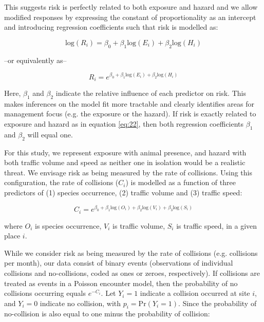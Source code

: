 This suggests risk is perfectly related to both exposure and hazard and we allow modified responses by expressing the constant of proportionality as an intercept and introducing regression coefficients such that risk is modelled as: 

\begin{equation} \label{eq:23}
\text{log}(R_i)=\beta_0+\beta_1\text{log}(E_i)+\beta_2\text{log}(H_i)
\end{equation}

\begin{center}
--or equivalently as--
\end{center}
\begin{equation} \label{eq:24}
R_i=e^{\beta_0+\beta_1\text{log}(E_i)+\beta_2\text{log}(H_i)}
\end{equation}

Here, $\beta_1$ and $\beta_2$ indicate the relative influence of each predictor on risk. This makes inferences on the model fit more tractable and clearly identifies areas for management focus (e.g. the exposure or the hazard). If risk is exactly related to exposure and hazard as in equation \ref{eq:22}, then both regression coefficients $\beta_1$ and $\beta_2$ will equal one.

For this study, we represent exposure with animal presence, and hazard with both traffic volume and speed as neither one in isolation would be a realistic threat. We envisage risk as being measured by the rate of collisions. Using this configuration, the rate of collisions ($C_i$) is modelled as a function of three predictors of (1) species occurrence, (2) traffic volume and (3) traffic speed: 
 
\begin{equation} \label{eq:25}
C_i=e^{\beta_0+\beta_1\text{log}(O_i)+\beta_2\text{log}(V_i)+\beta_3\text{log}(S_i)}
\end{equation}

where $O_i$ is species occurrence, $V_i$ is traffic volume, $S_i$ is traffic speed, in a given place $i$.

While we consider risk as being measured by the rate of collisions (e.g. collisions per month), our data consist of binary events (observations of individual collisions and no-collisions, coded as ones or zeroes, respectively). If collisions are treated as events in a Poisson encounter model, then the probability of no collisions occurring equals $e^{-C_i}$. Let $Y_i=1$ indicate a collision occurred at site $i$, and $Y_i=0$ indicate no collision, with $p_i=\text{Pr}(Y_i=1)$. Since the probability of no-collision is also equal to one minus the probability of collision:

